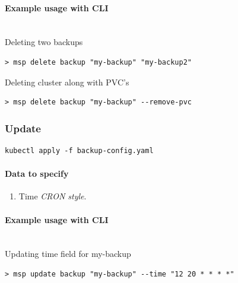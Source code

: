 \paragraph{Example usage with CLI}\mbox{}\\

\noindent Deleting two backups

\begin{lstlisting}
> msp delete backup "my-backup" "my-backup2"
\end{lstlisting}

\noindent Deleting cluster along with PVC’s

\begin{lstlisting}
> msp delete backup "my-backup" --remove-pvc
\end{lstlisting}

\subsubsection*{Update}
\begin{lstlisting}
kubectl apply -f backup-config.yaml
\end{lstlisting}

\paragraph{Data to specify}
\begin{enumerate}
	\item Time \textit{CRON style}.
\end{enumerate}

\paragraph{Example usage with CLI}\mbox{}\\

\noindent Updating time field for my-backup

\begin{lstlisting}
> msp update backup "my-backup" --time "12 20 * * * *"
\end{lstlisting}
